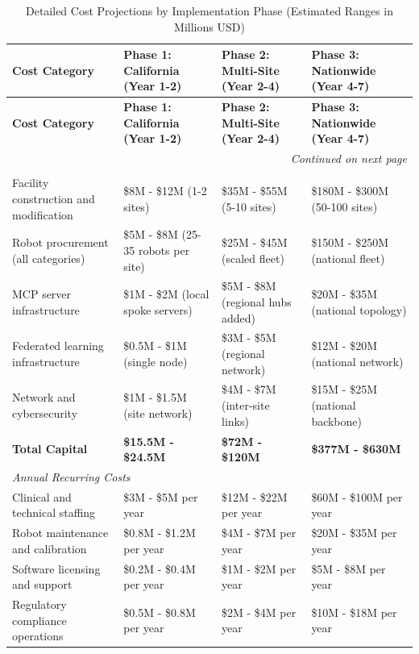 \begin{longtable}{l p{3.2cm} p{3.2cm} p{3.2cm}}
\caption{Detailed Cost Projections by Implementation Phase (Estimated Ranges in Millions USD)}
\label{tab:detailed-financial-projections} \\
\toprule
\textbf{Cost Category} & \textbf{Phase 1: California (Year 1-2)} & \textbf{Phase 2: Multi-Site (Year 2-4)} & \textbf{Phase 3: Nationwide (Year 4-7)} \\
\midrule
\endfirsthead
\toprule
\textbf{Cost Category} & \textbf{Phase 1: California (Year 1-2)} & \textbf{Phase 2: Multi-Site (Year 2-4)} & \textbf{Phase 3: Nationwide (Year 4-7)} \\
\midrule
\endhead
\midrule
\multicolumn{4}{r}{\textit{Continued on next page}} \\
\bottomrule
\endfoot
\bottomrule
\endlastfoot
\multicolumn{4}{l}{\textit{Capital Expenditures}} \\
\midrule
Facility construction and modification & \$8M - \$12M (1-2 sites) & \$35M - \$55M (5-10 sites) & \$180M - \$300M (50-100 sites) \\
Robot procurement (all categories) & \$5M - \$8M (25-35 robots per site) & \$25M - \$45M (scaled fleet) & \$150M - \$250M (national fleet) \\
MCP server infrastructure & \$1M - \$2M (local spoke servers) & \$5M - \$8M (regional hubs added) & \$20M - \$35M (national topology) \\
Federated learning infrastructure & \$0.5M - \$1M (single node) & \$3M - \$5M (regional network) & \$12M - \$20M (national network) \\
Network and cybersecurity & \$1M - \$1.5M (site network) & \$4M - \$7M (inter-site links) & \$15M - \$25M (national backbone) \\
\textbf{Total Capital} & \textbf{\$15.5M - \$24.5M} & \textbf{\$72M - \$120M} & \textbf{\$377M - \$630M} \\
\midrule
\multicolumn{4}{l}{\textit{Annual Recurring Costs}} \\
\midrule
Clinical and technical staffing & \$3M - \$5M per year & \$12M - \$22M per year & \$60M - \$100M per year \\
Robot maintenance and calibration & \$0.8M - \$1.2M per year & \$4M - \$7M per year & \$20M - \$35M per year \\
Software licensing and support & \$0.2M - \$0.4M per year & \$1M - \$2M per year & \$5M - \$8M per year \\
Regulatory compliance operations & \$0.5M - \$0.8M per year & \$2M - \$4M per year & \$10M - \$18M per year \\

\end{longtable}
